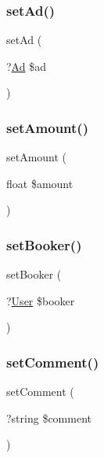 \subsubsection{\texorpdfstring{setAd()}{setAd()}}
{\footnotesize\ttfamily set\+Ad (\begin{DoxyParamCaption}\item[{?\mbox{\hyperlink{class_app_1_1_entity_1_1_ad}{Ad}}}]{\$ad }\end{DoxyParamCaption})}

\mbox{\label{class_app_1_1_entity_1_1_booking_a578faaf63e0b3c77b61aa210a47f7a8d}} 
\subsubsection{\texorpdfstring{setAmount()}{setAmount()}}
{\footnotesize\ttfamily set\+Amount (\begin{DoxyParamCaption}\item[{float}]{\$amount }\end{DoxyParamCaption})}

\mbox{\label{class_app_1_1_entity_1_1_booking_afa4194d843430923260288b8172fe893}} 
\subsubsection{\texorpdfstring{setBooker()}{setBooker()}}
{\footnotesize\ttfamily set\+Booker (\begin{DoxyParamCaption}\item[{?\mbox{\hyperlink{class_app_1_1_entity_1_1_user}{User}}}]{\$booker }\end{DoxyParamCaption})}

\mbox{\label{class_app_1_1_entity_1_1_booking_ae1bfc93cadcdc2ef59d5c8c91a438c52}} 
\subsubsection{\texorpdfstring{setComment()}{setComment()}}
{\footnotesize\ttfamily set\+Comment (\begin{DoxyParamCaption}\item[{?string}]{\$comment }\end{DoxyParamCaption})}


